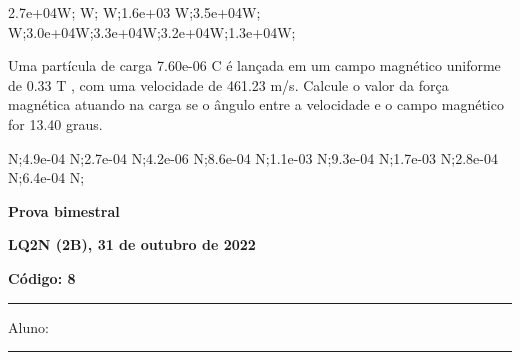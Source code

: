 \documentclass[12pt, addpoints]{exam}
\begin{document}
\begin{questions}
\begin{multicols*}{2}
\begin{oneparchoices}
\choice 2.7e+04W; W; W;\choice 1.6e+03 W;\choice 3.5e+04W; W;\choice 3.0e+04W;\choice 3.3e+04W;\choice 3.2e+04W;\choice 1.3e+04W;\end{oneparchoices}
\question[20] Uma partícula de carga 7.60e-06 C é lançada em um campo magnético uniforme de    0.33 T , com uma velocidade de 461.23 m/s. Calcule o valor da força magnética atuando na carga se o ângulo entre a velocidade e o campo magnético for   13.40 graus.

\begin{oneparchoices}
 N;\choice 4.9e-04 N;\choice 2.7e-04 N;\choice 4.2e-06 N;\choice 8.6e-04 N;\choice 1.1e-03 N;\choice 9.3e-04 N;\choice 1.7e-03 N;\choice 2.8e-04 N;\choice 6.4e-04 N;\end{oneparchoices}
\end{multicols*}
\end{questions}
\newpage
        \begin{minipage}[b]{0.75\linewidth}
            \begin{flushleft}
                {\bf \large Prova bimestral}
            \end{flushleft}
            \begin{flushleft}
                {\bf \large LQ2N (2B), 31 de outubro de 2022}
            \end{flushleft}
        \end{minipage}
        \begin{minipage}[b]{0.20\linewidth}
            \begin{flushright}
                {\bf \large Código: 8}
            \end{flushright}
        \end{minipage}
        \vspace{0.5cm} \hrule \vspace{0.5cm}
        \begin{minipage}{0.75\linewidth}
            Aluno:
        \end{minipage}
        \vspace{0.5cm} \hrule \vspace{0.5cm}
\end{document}
